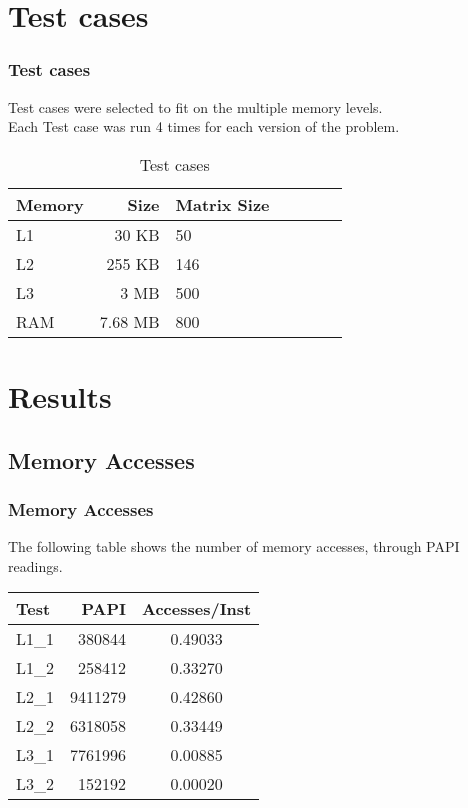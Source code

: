 \documentclass{beamer}
\begin{document}
\section{Test cases}
\begin{frame}
	\frametitle{Test cases}

	Test cases were selected to fit on the multiple memory levels.\\
	Each Test case was run 4 times for each version of the problem.

	\begin{center}
		\begin{table}[!htp]
	\begin{tabular}{lrlrlrl}
		\hline
		\textbf{Memory} & \textbf{Size} & \textbf{Matrix Size} \\
		\hline
		L1 & 30 KB & 50 \\
		L2 & 255 KB & 146 \\
		L3 & 3 MB & 500 \\
		RAM & 7.68 MB & 800 \\
		\hline
	\end{tabular}
	\caption{Test cases}
	\label{tab:testcases}
\end{table}
	\end{center}
\end{frame}

\section{Results}
\subsection{Memory Accesses}


\begin{frame}
	\frametitle{Memory Accesses}

	The following table shows the number of memory accesses, through PAPI readings.

	\begin{table}[!htp]
		\begin{center}
		{\small
			\begin{tabular}{|l|r|c|}

				\hline
				Test	&	PAPI	&	 Accesses/Inst		\\
				\hline
				L1\_1	&	380844 & 0.49033 \\
				L1\_2	&	258412 & 0.33270 \\
				L2\_1	&	9411279	& 0.42860\\
				L2\_2	&	6318058	& 0.33449\\
				L3\_1   &	7761996 & 0.00885\\
				L3\_2   &   152192 & 0.00020\\
				\hline
			\end{tabular}
		}
		\end{center}
	\end{table}
\end{frame}
\end{document}
